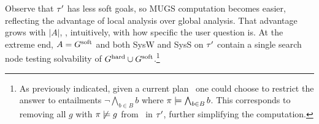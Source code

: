 %
%
%
%
%

Observe that $\tau'$ has less soft goals, so MUGS computation becomes
easier, reflecting the advantage of local analysis over global
analysis. That advantage grows with $|A|$, \ie, intuitively, with how
specific the user question is. At the extreme end, $A = G^{\text{\textup{soft}}}$ and
both SysW and SysS on $\tau'$ contain a single search node testing
solvability of $G^{\text{\textup{hard}}} \cup G^{\text{\textup{soft}}}$.\footnote{As previously
  indicated, given a current plan \plan\ one could choose to restrict
  the answer to entailments $\neg \bigwedge_{b \in B} b$ where $\pi
  \models \bigwedge_{b \in B} b$. This corresponds to removing all $g$
  with $\pi \not\models g$ from \goalsoft\ in $\tau'$, further
  simplifying the computation.}

















